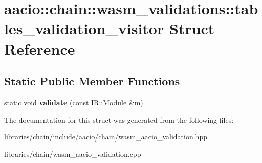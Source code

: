 \hypertarget{structaacio_1_1chain_1_1wasm__validations_1_1tables__validation__visitor}{}\section{aacio\+:\+:chain\+:\+:wasm\+\_\+validations\+:\+:tables\+\_\+validation\+\_\+visitor Struct Reference}
\label{structaacio_1_1chain_1_1wasm__validations_1_1tables__validation__visitor}
\subsection*{Static Public Member Functions}
\begin{DoxyCompactItemize}
\item 
\mbox{\label{structaacio_1_1chain_1_1wasm__validations_1_1tables__validation__visitor_a394d53178632923c4d3f4fc6db8aa095}} 
static void {\bfseries validate} (const \mbox{\hyperlink{struct_i_r_1_1_module}{I\+R\+::\+Module}} \&m)
\end{DoxyCompactItemize}


The documentation for this struct was generated from the following files\+:\begin{DoxyCompactItemize}
\item 
libraries/chain/include/aacio/chain/wasm\+\_\+aacio\+\_\+validation.\+hpp\item 
libraries/chain/wasm\+\_\+aacio\+\_\+validation.\+cpp\end{DoxyCompactItemize}
